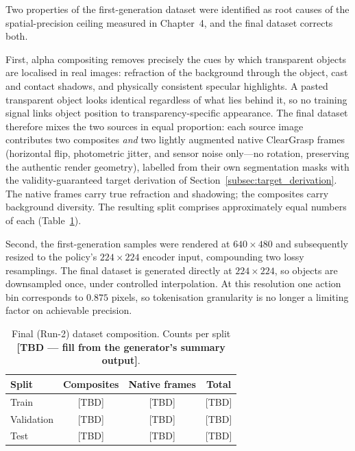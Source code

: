 Two properties of the first-generation dataset were identified as root causes
of the spatial-precision ceiling measured in Chapter~4, and the final dataset
corrects both.
 
First, alpha compositing removes precisely the cues by which transparent
objects are localised in real images: refraction of the background through the
object, cast and contact shadows, and physically consistent specular
highlights. A pasted transparent object looks identical regardless of what
lies behind it, so no training signal links object position to
transparency-specific appearance. The final dataset therefore mixes the two
sources in equal proportion: each source image contributes two composites
\emph{and} two lightly augmented native ClearGrasp frames (horizontal flip,
photometric jitter, and sensor noise only---no rotation, preserving the
authentic render geometry), labelled from their own segmentation masks with
the validity-guaranteed target derivation of
Section~\ref{subsec:target_derivation}. The native frames carry true
refraction and shadowing; the composites carry background diversity. The
resulting split comprises approximately equal numbers of each
(Table~\ref{tab:run2_dataset}).
 
Second, the first-generation samples were rendered at $640 \times 480$ and
subsequently resized to the policy's $224 \times 224$ encoder input,
compounding two lossy resamplings. The final dataset is generated directly at
$224 \times 224$, so objects are downsampled once, under controlled
interpolation. At this resolution one action bin corresponds to $0.875$
pixels, so tokenisation granularity is no longer a limiting factor on
achievable precision.
\begin{table}[htbp]
    \centering
    \caption{Final (Run-2) dataset composition. Counts per split
    \textbf{[TBD --- fill from the generator's summary output]}.}
    \label{tab:run2_dataset}
    \begin{tabular}{lccc}
        \toprule
        \textbf{Split} & \textbf{Composites} & \textbf{Native frames} & \textbf{Total} \\
        \midrule
        Train & [TBD] & [TBD] & [TBD] \\
        Validation & [TBD] & [TBD] & [TBD] \\
        Test & [TBD] & [TBD] & [TBD] \\
        \bottomrule
    \end{tabular}
\end{table}

